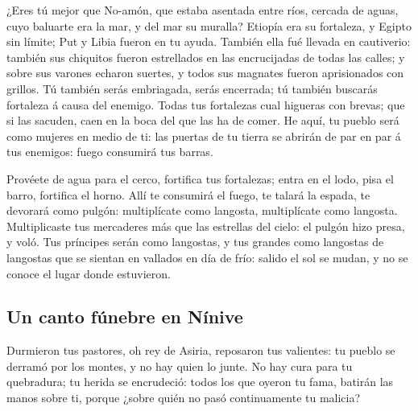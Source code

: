  ¿Eres tú mejor que No-amón, que estaba asentada entre ríos,
cercada de aguas, cuyo baluarte era la mar, y del mar su muralla?
 Etiopía era su fortaleza, y Egipto sin límite; Put y Libia
fueron en tu ayuda.  También ella fué llevada en
cautiverio: también sus chiquitos fueron estrellados en las encrucijadas
de todas las calles; y sobre sus varones echaron suertes, y todos sus
magnates fueron aprisionados con grillos.  Tú también serás
embriagada, serás encerrada; tú también buscarás fortaleza á causa del
enemigo.  Todas tus fortalezas cual higueras con brevas;
que si las sacuden, caen en la boca del que las ha de comer.
 He aquí, tu pueblo será como mujeres en medio de ti: las
puertas de tu tierra se abrirán de par en par á tus enemigos: fuego
consumirá tus barras.

 Provéete de agua para el cerco, fortifica tus fortalezas;
entra en el lodo, pisa el barro, fortifica el horno.  Allí
te consumirá el fuego, te talará la espada, te devorará como pulgón:
multiplícate como langosta, multiplícate como langosta. 
Multiplicaste tus mercaderes más que las estrellas del cielo: el pulgón
hizo presa, y voló.  Tus príncipes serán como langostas, y
tus grandes como langostas de langostas que se sientan en vallados en
día de frío: salido el sol se mudan, y no se conoce el lugar donde
estuvieron.

\hypertarget{un-canto-fuxfanebre-en-nuxednive}{%
\subsection{Un canto fúnebre en
Nínive}\label{un-canto-fuxfanebre-en-nuxednive}}

 Durmieron tus pastores, oh rey de Asiria, reposaron tus
valientes: tu pueblo se derramó por los montes, y no hay quien lo junte.
 No hay cura para tu quebradura; tu herida se encrudeció:
todos los que oyeron tu fama, batirán las manos sobre ti, porque ¿sobre
quién no pasó continuamente tu malicia?
